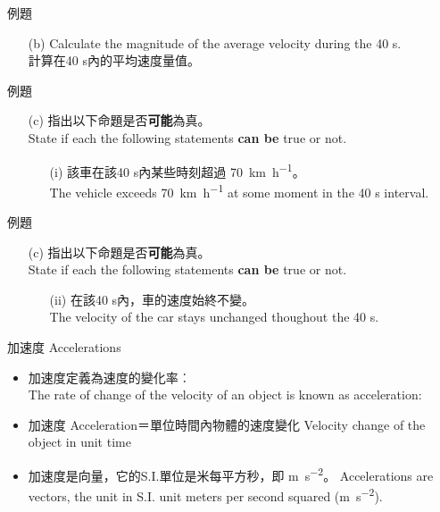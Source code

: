 \documentclass[beamer=true]{standalone}
\begin{document}
\begin{frame}[t]{例題}

    \begin{itemize}
        \item [(b)]Calculate the magnitude of the average velocity during the 40 s. \\計算在40 s內的平均速度量值。
    \end{itemize}
\end{frame}
\begin{frame}[t]{例題}

    \begin{itemize}
        \item [(c)]指出以下命題是否\textbf{可能}為真。\\State if each the following statements \textbf{can be} true or not.
              \begin{itemize}
                  \item [(i)]該車在該40 s內某些時刻超過 \qty{70}{km.h^{-1}}。\\The vehicle exceeds \qty{70}{km.h^{-1}} at some moment in the 40 s interval.
              \end{itemize}
    \end{itemize}
\end{frame}
\begin{frame}[t]{例題}

    \begin{itemize}
        \item [(c)]指出以下命題是否\textbf{可能}為真。\\State if each the following statements \textbf{can be} true or not.
              \begin{itemize}
                  \item [(ii)]在該40 s內，車的速度始終不變。\\The velocity of the car stays unchanged thoughout the 40 s.
              \end{itemize}
    \end{itemize}
\end{frame}
\begin{frame}{加速度 Accelerations}
    \begin{itemize}
        \item 加速度定義為速度的變化率︰ \\The rate of change of the velocity of an object is known as acceleration:
        \item 加速度 Acceleration＝單位時間內物體的速度變化 Velocity change of the object in unit time
        \item 加速度是向量，它的S.I.單位是米每平方秒，即 \unit{m.s^{-2}}。 Accelerations are vectors, the unit in S.I. unit meters per second squared (\unit{m.s^{-2}}).
    \end{itemize}
\end{frame}
\end{document}
